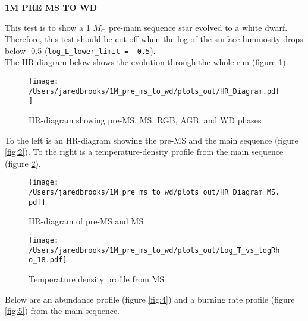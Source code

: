 \documentclass{article}
\begin{document}
	
	\begin{center}
	  \begin{Large}
	    \textbf{1M PRE MS TO WD}\\
	  \end{Large}
	\end{center}

        This test is to show a 1 $M_\odot$ pre-main sequence star evolved to a white dwarf.  Therefore, this test should be cut off when the log of the surface luminosity drops below -0.5 (\texttt{log\_L\_lower\_limit = -0.5}).\\

        The HR-diagram below shows the evolution through the whole run (figure \ref{fig:1}).

        \begin{figure}[H]
          \centering
          \texttt{[image: /Users/jaredbrooks/1M\_pre\_ms\_to\_wd/plots\_out/HR\_Diagram.pdf]}
          \caption{HR-diagram showing pre-MS, MS, RGB, AGB, and WD phases}
          \label{fig:1}
        \end{figure}

        \pagebreak

        To the left is an HR-diagram showing the pre-MS and the main sequence (figure \ref{fig:2}).  To the right is a temperature-density profile from the main sequence (figure \ref{fig:3}).

        \begin{figure}[H]
          \begin{minipage}[b]{0.5\linewidth}
            \centering
            \texttt{[image: /Users/jaredbrooks/1M\_pre\_ms\_to\_wd/plots\_out/HR\_Diagram\_MS.pdf]}
            \caption{HR-diagram of pre-MS and MS}
            \label{fig:2}
          \end{minipage}
          \hspace{0cm}
          \begin{minipage}[b]{0.5\linewidth}
            \centering
            \texttt{[image: /Users/jaredbrooks/1M\_pre\_ms\_to\_wd/plots\_out/Log\_T\_vs\_logRho\_18.pdf]}
            \caption{Temperature density profile from MS}
            \label{fig:3}
          \end{minipage}
        \end{figure}

        Below are an abundance profile (figure \ref{fig:4}) and a burning rate profile (figure \ref{fig:5}) from the main sequence.
\end{document}
